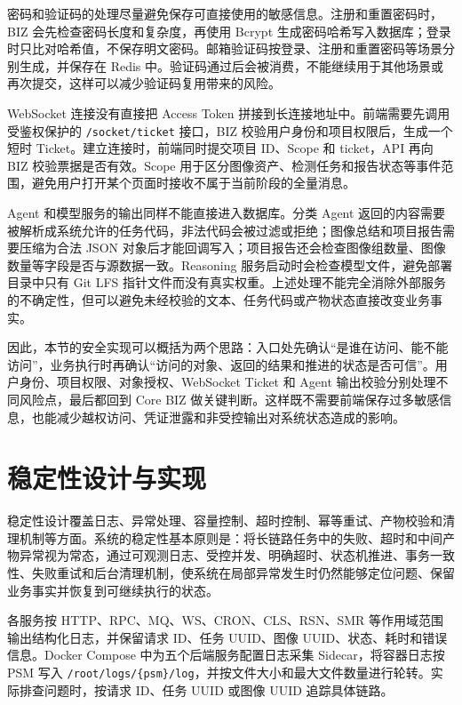 密码和验证码的处理尽量避免保存可直接使用的敏感信息。注册和重置密码时，BIZ 会先检查密码长度和复杂度，再使用 Bcrypt 生成密码哈希写入数据库；登录时只比对哈希值，不保存明文密码。邮箱验证码按登录、注册和重置密码等场景分别生成，并保存在 Redis 中。验证码通过后会被消费，不能继续用于其他场景或再次提交，这样可以减少验证码复用带来的风险。

WebSocket 连接没有直接把 Access Token 拼接到长连接地址中。前端需要先调用受鉴权保护的 \texttt{/socket/ticket} 接口，BIZ 校验用户身份和项目权限后，生成一个短时 Ticket。建立连接时，前端同时提交项目 ID、Scope 和 ticket，API 再向 BIZ 校验票据是否有效。Scope 用于区分图像资产、检测任务和报告状态等事件范围，避免用户打开某个页面时接收不属于当前阶段的全量消息。

Agent 和模型服务的输出同样不能直接进入数据库。分类 Agent 返回的内容需要被解析成系统允许的任务代码，非法代码会被过滤或拒绝；图像总结和项目报告需要压缩为合法 JSON 对象后才能回调写入；项目报告还会检查图像组数量、图像数量等字段是否与源数据一致。Reasoning 服务启动时会检查模型文件，避免部署目录中只有 Git LFS 指针文件而没有真实权重。上述处理不能完全消除外部服务的不确定性，但可以避免未经校验的文本、任务代码或产物状态直接改变业务事实。

因此，本节的安全实现可以概括为两个思路：入口处先确认“是谁在访问、能不能访问”，业务执行时再确认“访问的对象、返回的结果和推进的状态是否可信”。用户身份、项目权限、对象授权、WebSocket Ticket 和 Agent 输出校验分别处理不同风险点，最后都回到 Core BIZ 做关键判断。这样既不需要前端保存过多敏感信息，也能减少越权访问、凭证泄露和非受控输出对系统状态造成的影响。

\section{稳定性设计与实现}
\label{sec:implementation-stability-design-and-implementation}

稳定性设计覆盖日志、异常处理、容量控制、超时控制、幂等重试、产物校验和清理机制等方面。系统的稳定性基本原则是：将长链路任务中的失败、超时和中间产物异常视为常态，通过可观测日志、受控并发、明确超时、状态机推进、事务一致性、失败重试和后台清理机制，使系统在局部异常发生时仍然能够定位问题、保留业务事实并恢复到可继续执行的状态。

各服务按 HTTP、RPC、MQ、WS、CRON、CLS、RSN、SMR 等作用域范围输出结构化日志，并保留请求 ID、任务 UUID、图像 UUID、状态、耗时和错误信息。Docker Compose 中为五个后端服务配置日志采集 Sidecar，将容器日志按 PSM 写入 \texttt{/root/logs/\{psm\}/log}，并按文件大小和最大文件数量进行轮转。实际排查问题时，按请求 ID、任务 UUID 或图像 UUID 追踪具体链路。

